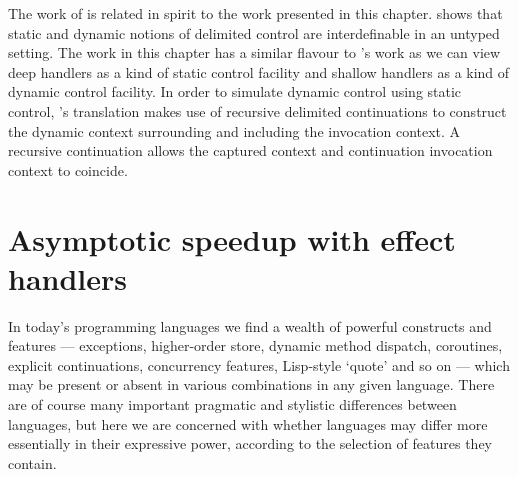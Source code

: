 \documentclass[12pt,phd,lfcs,twoside,openright,logo,leftchapter,normalheadings]{infthesis}
\theoremstyle{plain}
\theoremstyle{definition}
\begin{document}
The work of \citet{Shan04,Shan07} is related in spirit to the work
presented in this chapter. \citeauthor{Shan04} shows that static and
dynamic notions of delimited control are interdefinable in an untyped
setting. The work in this chapter has a similar flavour to
\citeauthor{Shan04}'s work as we can view deep handlers as a kind of
static control facility and shallow handlers as a kind of dynamic
control facility. In order to simulate dynamic control using static
control, \citeauthor{Shan04}'s translation makes use of recursive
delimited continuations to construct the dynamic context surrounding
and including the invocation context. A recursive continuation allows
the captured context and continuation invocation context to coincide.


\chapter{Asymptotic speedup with effect handlers}
\label{ch:handlers-efficiency}
\def\LLL{{\mathcal L}}
\def\N{{\mathbb N}}
%
In today's programming languages we find a wealth of powerful
constructs and features --- exceptions, higher-order store, dynamic
method dispatch, coroutines, explicit continuations, concurrency
features, Lisp-style `quote' and so on --- which may be present or
absent in various combinations in any given language.  There are of
course many important pragmatic and stylistic differences between
languages, but here we are concerned with whether languages may differ
more essentially in their expressive power, according to the selection
of features they contain.
\end{document}
